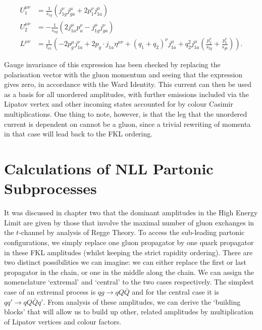 \begin{equation}
\begin{split}
U_1^{\mu \nu} &= \frac{1}{s_{1g}}(j^\nu_{1g}j^\mu_{ga} + 2 p_1^\nu j^\mu_{1a}) \\
U_2^{\mu \nu} &= -\frac{1}{s_{ag}}(2j^\mu_{1a}p_a^\nu - j^\mu_{1g}j^\nu_{ga}) \\
L^{\mu \nu} &= \frac{1}{t_{a1}} \left(-2p^\mu_g j^\nu_{1a} + 2 p_g \cdot j_{1a}\eta^{\mu \nu} + (q_1 + q_2)^\nu j^{\mu}_{1a} + q_2^2 j^\mu_{1a} \left(\frac{p_2^\nu}{s_{2g}} + \frac{p_b^\nu}{s_{gb}} \right) \right).
\end{split}
\end{equation}




Gauge invariance of this expression has been checked by replacing the polarisation vector with the gluon momentum and seeing that the expression gives zero, in accordance with the Ward Identity. This current can then be used as a basis for all unordered amplitudes, with further emissions included via the Lipatov vertex and other incoming states accounted for by colour Casimir multiplications. One thing to note, however, is that the leg that the unordered current is dependent on cannot be a gluon, since a trivial rewriting of momenta in that case will lead back to the FKL ordering. 

\section{Calculations of NLL Partonic Subprocesses}

It was discussed in chapter two that the dominant amplitudes in the High Energy Limit are given by those that involve the maximal number of gluon exchanges in the $t$-channel by analysis of Regge Theory. To access the sub-leading partonic configurations, we simply replace one gluon propagator by one quark propagator in these FKL amplitudes (whilst keeping the strict rapidity ordering). There are two distinct possibilities we can imagine: we can either replace the first or last propagator in the chain, or one in the middle along the chain. We can assign the nomenclature `extremal' and `central' to the two cases respectively. The simplest case of an extremal process is $qg \to qQ\bar{Q}$ and for the central case it is $qq' \to qQ\bar{Q}q'$. From analysis of these amplitudes, we can derive the `building blocks' that will allow us to build up other, related amplitudes by multiplication of Lipatov vertices and colour factors. 

